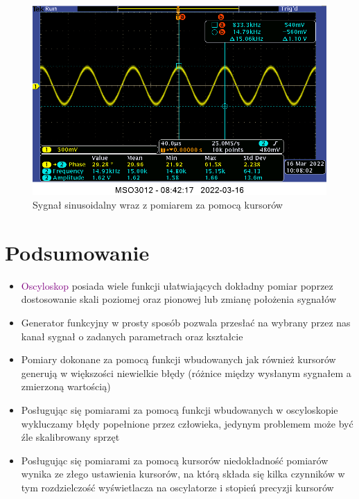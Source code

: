 \begin{itemize}
    \begin{figure}[h]
        \centering
        \includegraphics[scale=0.3]{images/1_4sine_smaller.png}
        \caption{Sygnał sinusoidalny wraz z pomiarem za pomocą kursorów}
        \label{fig:pomiar_sinus}
    \end{figure}
\end{itemize}

\section{Podsumowanie}

\begin{itemize}
    \item \textcolor{purple}{Oscyloskop} posiada wiele funkcji ułatwiających dokładny pomiar poprzez dostosowanie skali poziomej oraz pionowej lub zmianę położenia sygnałów
    \label{ad:zla_nazwa_sprzetu_2_5}
    \item Generator funkcyjny w prosty sposób pozwala przesłać na wybrany przez nas kanał sygnał o zadanych parametrach oraz kształcie
    \item Pomiary dokonane za pomocą funkcji wbudowanych jak również kursorów generują w większości niewielkie błędy (różnice między wysłanym sygnałem a zmierzoną wartością)
    \item Posługując się pomiarami za pomocą funkcji wbudowanych w oscyloskopie wykluczamy błędy popełnione przez człowieka, jedynym problemem może być źle skalibrowany sprzęt
    \item Posługując się pomiarami za pomocą kursorów niedokładność pomiarów wynika ze złego ustawienia kursorów, na którą składa się kilka czynników w tym rozdzielczość wyświetlacza na oscylatorze i stopień precyzji kursorów
\end{itemize}